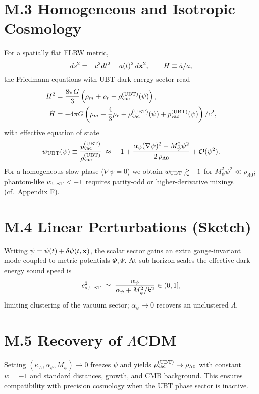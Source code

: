 \documentclass[12pt]{article}
\begin{document}
\section*{M.3 Homogeneous and Isotropic Cosmology}
For a spatially flat FLRW metric,
\begin{equation}
ds^2=-c^2dt^2+a(t)^2\,d\vb{x}^2,\qquad H\equiv \dot{a}/a,
\end{equation}
the Friedmann equations with UBT dark-energy sector read
\begin{align}
H^2 &= \frac{8\pi G}{3}\left(\rho_m+\rho_r+\rho_{\rm vac}^{\rm (UBT)}(\psi)\right),\\
\dot{H} &= -4\pi G\left(\rho_m+\frac{4}{3}\rho_r+\rho_{\rm vac}^{\rm (UBT)}(\psi)+p_{\rm vac}^{\rm (UBT)}(\psi)\right)/c^2,
\end{align}
with effective equation of state
\begin{equation}
w_{\rm UBT}(\psi)\equiv \frac{p_{\rm vac}^{\rm (UBT)}}{\rho_{\rm vac}^{\rm (UBT)}}\;\approx\;-1+\frac{\alpha_\psi (\nabla\psi)^2 - M_\psi^2\psi^2}{2\,\rho_{\Lambda 0}}+\mathcal{O}(\psi^2).
\end{equation}
For a homogeneous slow phase ($\nabla\psi=0$) we obtain $w_{\rm UBT}\gtrsim -1$ for $M_\psi^2\psi^2\!\ll\!\rho_{\Lambda 0}$; phantom-like $w_{\rm UBT}<-1$ requires parity-odd or higher-derivative mixings (cf.\ Appendix F).

\section*{M.4 Linear Perturbations (Sketch)}
Writing $\psi=\bar{\psi}(t)+\delta\psi(t,\vb{x})$, the scalar sector gains an extra gauge-invariant mode coupled to metric potentials $\Phi,\Psi$.
At sub-horizon scales the effective dark-energy sound speed is
\begin{equation}
c_{s,\rm UBT}^2 \;\simeq\; \frac{\alpha_\psi}{\alpha_\psi + M_\psi^2/k^2}\in(0,1],
\end{equation}
limiting clustering of the vacuum sector; $\alpha_\psi\!\to\!0$ recovers an unclustered $\Lambda$.

\section*{M.5 Recovery of $\Lambda$CDM}
Setting $(\kappa_\Lambda,\alpha_\psi,M_\psi)\to 0$ freezes $\psi$ and yields $\rho_{\rm vac}^{\rm (UBT)}\to \rho_{\Lambda 0}$ with constant $w=-1$ and standard distances, growth, and CMB background. This ensures compatibility with precision cosmology when the UBT phase sector is inactive.
\end{document}
